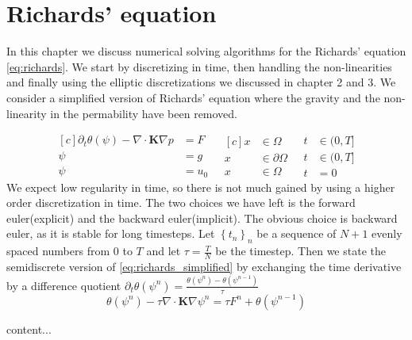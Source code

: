 \documentclass[../Main/main.tex]{subfiles}
\begin{document}
	\graphicspath{{../Richards equation/figs/}}
	\chapter{Richards' equation}
	In this chapter we discuss numerical solving algorithms for the Richards' equation \eqref{eq:richards}. We start by discretizing in time, then handling the non-linearities and finally using the elliptic discretizations we discussed in chapter 2 and 3. We consider a simplified version of Richards' equation where the gravity and the non-linearity in the permability have been removed.
	
	\begin{equation}\label{eq:richards_simplified}
		\begin{aligned}[c]
			\partial_t \theta (\psi) - \nabla \cdot \pmb{K} \nabla p &= F \\
			\psi &= g \\
			\psi &= u_0
		\end{aligned}
		\ \ \
		\begin{aligned}[c]
			x &\in \Omega  \\
			x &\in \partial \Omega \\
			x &\in \Omega  
		\end{aligned}
		\ \ \
		\begin{aligned}
			t&\in (0,T] \\
			t&\in (0,T] \\
			t&=0
		\end{aligned}
	\end{equation}
	We expect low regularity in time, so there is not much gained by using a higher order discretization in time. The two choices we have left is the forward euler(explicit) and the backward euler(implicit). The obvious choice is backward euler, as it is stable for long timesteps. Let $\left \{ t_n \right \}_n$ be a sequence of $N+1$ evenly spaced numbers from $0$ to $T$ and let $\tau = \frac{T}{N}$ be the timestep. Then we state the semidiscrete version of \eqref{eq:richards_simplified} by exchanging the time derivative by a difference quotient $\partial_t \theta (\psi^n) = \frac{\theta(\psi^n)-\theta(\psi^{n-1})}{\tau}$
	\begin{equation}
		 \theta (\psi^n) - \tau \nabla \cdot \pmb{K} \nabla \psi^n = \tau F^n+\theta(\psi^{n-1})
	\end{equation}
	
	\begin{definition}
		content...
	\end{definition}
\end{document}
